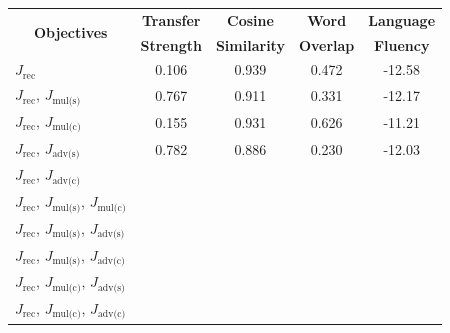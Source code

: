 \documentclass[letterpaper]{article} %
\newcommand{\tabh}[1]{\multicolumn{1}{c|}{\textbf{#1}}}
\newcommand{\tabc}[2]{\multicolumn{1}{|c||}{\multirow{#1}{*}{\textbf{#2}}}}
\newcommand{\loss}[1]{J_{\text{#1}}}
\begin{document}
\begin{table}[ht]
	\centering
	\begin{tabular}{| l || c | c | c | c |}
		\hline
		\tabc{2}{Objectives}                                                             & \tabh{Transfer} & \tabh{Cosine}     & \tabh{Word}    & \tabh{Language} \\
		                                                                                 & \tabh{Strength} & \tabh{Similarity} & \tabh{Overlap} & \tabh{Fluency}  \\
		\hline
		\hline
		$\loss{rec}$                                                                     & 0.106           & 0.939             & 0.472          & -12.58          \\
		\hline
		$\loss{rec}$, $\loss{mul(s)}$                                                    & 0.767           & 0.911             & 0.331          & -12.17          \\
		\hline
		$\loss{rec}$, $\loss{mul(c)}$                                                    & 0.155           & 0.931             & 0.626          & -11.21          \\
		\hline
		$\loss{rec}$, $\loss{adv(s)}$                                                    & 0.782           & 0.886             & 0.230          & -12.03          \\
		\hline
		$\loss{rec}$, $\loss{adv(c)}$                                                    &                 &                   &                &                 \\
		\hline
		$\loss{rec}$, $\loss{mul(s)}$, $\loss{mul(c)}$                                   &                 &                   &                &                 \\
		\hline
		$\loss{rec}$, $\loss{mul(s)}$, $\loss{adv(s)}$                                   &                 &                   &                &                 \\
		\hline
		$\loss{rec}$, $\loss{mul(s)}$, $\loss{adv(c)}$                                   &                 &                   &                &                 \\
		\hline
		$\loss{rec}$, $\loss{mul(c)}$, $\loss{adv(s)}$                                   &                 &                   &                &                 \\
		\hline
		$\loss{rec}$, $\loss{mul(c)}$, $\loss{adv(c)}$                                   &                 &                   &                &                 \\

\end{tabular}
\end{table}
\end{document}

